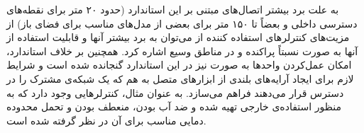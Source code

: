 به علت برد بیشتر اتصال‌های مبتنی بر این استاندارد (حدود ۲۰ متر برای نقطه‌های دسترسی داخلی و بعضاً تا ۱۵۰ متر برای بعضی از مدل‌های مناسب برای فضای باز) از مزیت‌های کنترلرهای استفاده کننده از  می‌توان به برد بیشتر آنها و قابلیت استفاده از آنها به صورت نسبتاً پراکنده و در مناطق وسیع اشاره کرد. همچنین بر خلاف استاندارد، امکان عمل‌کردن واحدها به صورت  نیز در این استاندارد گنجانده شده است و شرایط لازم برای ایجاد آرایه‌های بلندی از ابزارهای متصل به هم که یک شبکه‌ی مشترک را در دسترس قرار می‌دهند فراهم می‌سازد. به عنوان مثال، کنترلرهایی وجود دارد که به منظور استفاده‌ی خارجی تهیه شده و ضد آب بودن، منعطف بودن و تحمل محدوده دمایی مناسب برای آن در نظر گرفته شده است.

